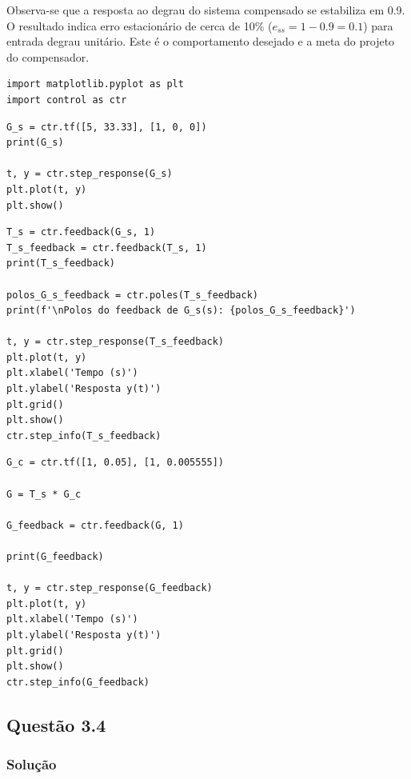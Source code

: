 \documentclass[a4paper,11pt]{article}
\begin{document}
Observa-se que a resposta ao degrau do sistema compensado se estabiliza em 0.9. O resultado indica erro estacionário de cerca de 10\% ($e_{ss} = 1 - 0.9=0.1$) para entrada degrau unitário. Este é o comportamento desejado e a meta do projeto do compensador.

\begin{lstlisting}[caption = {Código da Questão 3.3}]
import matplotlib.pyplot as plt
import control as ctr
\end{lstlisting}
\begin{lstlisting}[caption = {Código da Questão 3.3}]
G_s = ctr.tf([5, 33.33], [1, 0, 0])
print(G_s)

t, y = ctr.step_response(G_s)
plt.plot(t, y)
plt.show()
\end{lstlisting}
\begin{lstlisting}[caption = {Código da Questão 3.3}]
T_s = ctr.feedback(G_s, 1)
T_s_feedback = ctr.feedback(T_s, 1)
print(T_s_feedback)

polos_G_s_feedback = ctr.poles(T_s_feedback)  
print(f'\nPolos do feedback de G_s(s): {polos_G_s_feedback}')

t, y = ctr.step_response(T_s_feedback)
plt.plot(t, y)
plt.xlabel('Tempo (s)')
plt.ylabel('Resposta y(t)')
plt.grid()
plt.show()
ctr.step_info(T_s_feedback)
\end{lstlisting}
\begin{lstlisting}[caption = {Código da Questão 3.3}]
G_c = ctr.tf([1, 0.05], [1, 0.005555])

G = T_s * G_c

G_feedback = ctr.feedback(G, 1)

print(G_feedback)

t, y = ctr.step_response(G_feedback)
plt.plot(t, y)
plt.xlabel('Tempo (s)')
plt.ylabel('Resposta y(t)')
plt.grid()
plt.show()
ctr.step_info(G_feedback)
\end{lstlisting}


\subsection*{\sc Questão 3.4}

\subsubsection*{\sc Solução}
\end{document}
